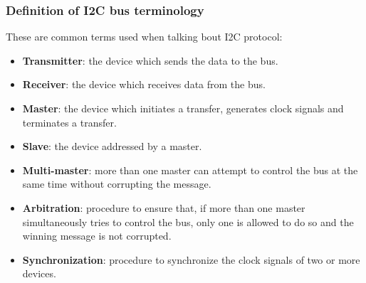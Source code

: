 \subsubsection{Definition of I2C bus terminology}
These are common terms used when talking bout I2C protocol:

\begin{itemize}
	\item	\textbf{Transmitter}: the device which sends the data to the bus.
	\item	\textbf{Receiver}: the device which receives data from the bus.
	\item	\textbf{Master}: the device which initiates a transfer, generates clock signals and terminates a transfer.
	\item	\textbf{Slave}: the device addressed by a master.
	\item	\textbf{Multi-master}: more than one master can attempt to control the bus at the same time without corrupting the message.
	\item	\textbf{Arbitration}: procedure to ensure that, if more than one master simultaneously tries to control the bus, only one is allowed to do so and the winning message is not corrupted.
	\item	\textbf{Synchronization}: procedure to synchronize the clock signals of two or more devices.
\end{itemize}
